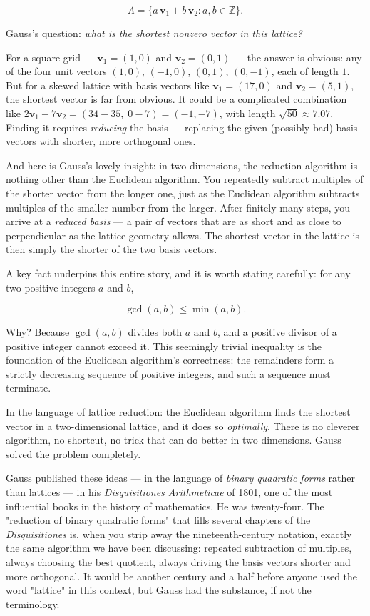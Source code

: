 \[
\Lambda = \{a\,\mathbf{v}_1 + b\,\mathbf{v}_2 : a, b \in \mathbb{Z}\}.\]

Gauss's question: \textit{what is the shortest nonzero vector in this lattice?}

For a square grid --- $\mathbf{v}_1 = (1, 0)$ and $\mathbf{v}_2 = (0, 1)$ --- the answer is obvious: any of the four unit vectors $(1,0)$, $(-1,0)$, $(0,1)$, $(0,-1)$, each of length $1$. But for a skewed lattice with basis vectors like $\mathbf{v}_1 = (17, 0)$ and $\mathbf{v}_2 = (5, 1)$, the shortest vector is far from obvious. It could be a complicated combination like $2\mathbf{v}_1 - 7\mathbf{v}_2 = (34 - 35,\; 0 - 7) = (-1, -7)$, with length $\sqrt{50} \approx 7.07$. Finding it requires \textit{reducing} the basis --- replacing the given (possibly bad) basis vectors with shorter, more orthogonal ones.

And here is Gauss's lovely insight: in two dimensions, the reduction algorithm is nothing other than the Euclidean algorithm. You repeatedly subtract multiples of the shorter vector from the longer one, just as the Euclidean algorithm subtracts multiples of the smaller number from the larger. After finitely many steps, you arrive at a \textit{reduced basis} --- a pair of vectors that are as short and as close to perpendicular as the lattice geometry allows. The shortest vector in the lattice is then simply the shorter of the two basis vectors.


A key fact underpins this entire story, and it is worth stating carefully: for any two positive integers $a$ and $b$,

\[
\gcd(a, b) \le \min(a, b).\]

Why? Because $\gcd(a, b)$ divides both $a$ and $b$, and a positive divisor of a positive integer cannot exceed it. This seemingly trivial inequality is the foundation of the Euclidean algorithm's correctness: the remainders form a strictly decreasing sequence of positive integers, and such a sequence must terminate.

In the language of lattice reduction: the Euclidean algorithm finds the shortest vector in a two-dimensional lattice, and it does so \textit{optimally}. There is no cleverer algorithm, no shortcut, no trick that can do better in two dimensions. Gauss solved the problem completely.

Gauss published these ideas --- in the language of \textit{binary quadratic forms} rather than lattices --- in his \textit{Disquisitiones Arithmeticae} of 1801, one of the most influential books in the history of mathematics. He was twenty-four. The "reduction of binary quadratic forms" that fills several chapters of the \textit{Disquisitiones} is, when you strip away the nineteenth-century notation, exactly the same algorithm we have been discussing: repeated subtraction of multiples, always choosing the best quotient, always driving the basis vectors shorter and more orthogonal. It would be another century and a half before anyone used the word "lattice" in this context, but Gauss had the substance, if not the terminology.

